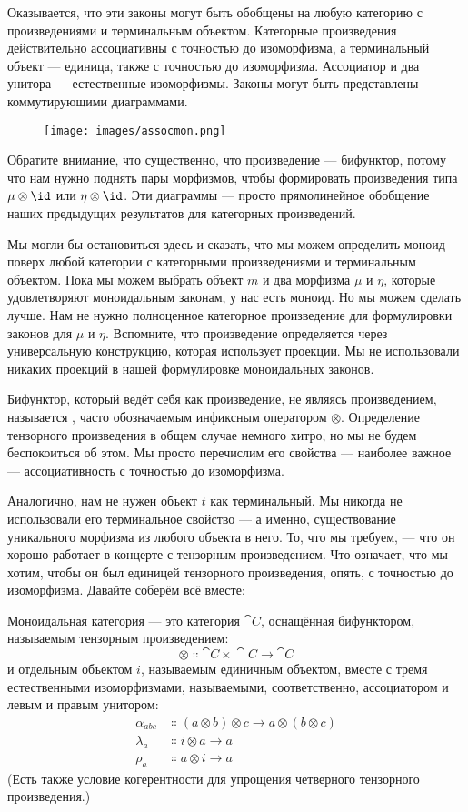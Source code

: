 Оказывается, что эти законы могут быть обобщены на любую категорию с
произведениями и терминальным объектом. Категорные произведения действительно
ассоциативны с точностью до изоморфизма, а терминальный объект --- единица, также
с точностью до изоморфизма. Ассоциатор и два унитора ---
естественные изоморфизмы. Законы могут быть представлены коммутирующими диаграммами.

\begin{figure}[H]
  \centering
  \texttt{[image: images/assocmon.png]}
\end{figure}

\noindent
Обратите внимание, что существенно, что произведение --- бифунктор,
потому что нам нужно поднять пары морфизмов, чтобы формировать произведения типа
$\mu \otimes \id$ или $\eta \otimes \id$. Эти диаграммы --- просто
прямолинейное обобщение наших предыдущих результатов для категорных
произведений.

Мы могли бы остановиться здесь и сказать, что мы можем определить моноид поверх любой
категории с категорными произведениями и терминальным объектом. Пока мы
можем выбрать объект $m$ и два морфизма $\mu$ и $\eta$, которые удовлетворяют
моноидальным законам, у нас есть моноид. Но мы можем сделать лучше. Нам
не нужно полноценное категорное произведение для формулировки законов для $\mu$
и $\eta$. Вспомните, что произведение определяется через универсальную конструкцию,
которая использует проекции. Мы не использовали никаких проекций в нашей
формулировке моноидальных законов.

Бифунктор, который ведёт себя как произведение, не являясь произведением,
называется , часто обозначаемым инфиксным оператором $\otimes$.
Определение тензорного произведения в общем случае немного хитро, но мы не будем
беспокоиться об этом. Мы просто перечислим его свойства --- наиболее важное ---
ассоциативность с точностью до изоморфизма.

Аналогично, нам не нужен объект $t$ как терминальный. Мы никогда не
использовали его терминальное свойство --- а именно, существование уникального
морфизма из любого объекта в него. То, что мы требуем, --- что он хорошо работает в
концерте с тензорным произведением. Что означает, что мы хотим, чтобы он был
единицей тензорного произведения, опять, с точностью до изоморфизма. Давайте соберём всё
вместе:

Моноидальная категория --- это категория $\cat{C}$, оснащённая бифунктором,
называемым тензорным произведением:
\[\otimes \Colon \cat{C}\times{}\cat{C} \to \cat{C}\]
и отдельным объектом $i$, называемым единичным объектом, вместе с
тремя естественными изоморфизмами, называемыми, соответственно, ассоциатором и
левым и правым унитором:
\begin{align*}
  \alpha_{a b c} & \Colon (a \otimes b) \otimes c \to a \otimes (b \otimes c) \\
  \lambda_a      & \Colon i \otimes a \to a                                   \\
  \rho_a         & \Colon a \otimes i \to a
\end{align*}
(Есть также условие когерентности для упрощения четверного тензорного
произведения.)

